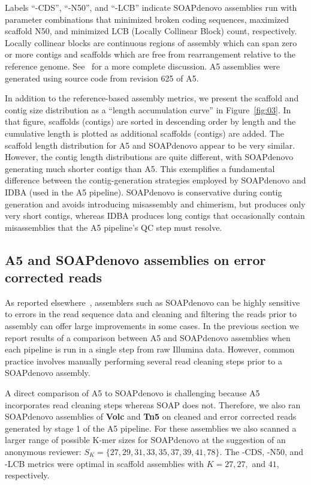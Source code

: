 \documentclass[10pt]{article}
\begin{document}
Labels ``-CDS'', ``-N50'', and ``-LCB'' indicate SOAPdenovo assemblies run with parameter combinations that minimized broken coding 
sequences, maximized scaffold N50, and minimized LCB (Locally Collinear Block) count, respectively. Locally collinear blocks are continuous regions of assembly which can span zero or more contigs and scaffolds which are free from rearrangement relative to the reference genome. See~\cite{mauve,Darling2011} for a more complete discussion.
A5 assemblies were generated using source code from revision 625 of A5.

In addition to the reference-based assembly metrics, we present the scaffold and contig size distribution as a ``length accumulation curve'' in Figure~\ref{fig:03}. 
In that figure, scaffolds (contigs) are sorted in descending order by length and the cumulative length is plotted as additional scaffolds (contigs) are added. 
The scaffold length distribution for A5 and SOAPdenovo appear to be very similar. However, the contig length distributions are quite different, with SOAPdenovo generating much shorter contigs than A5.
This exemplifies a fundamental difference between the contig-generation strategies employed by SOAPdenovo and IDBA (used in the A5 pipeline).
SOAPdenovo is conservative during contig generation and avoids introducing misassembly and chimerism, but produces only very short contigs, whereas IDBA produces long contigs that occasionally contain misassemblies that the A5 pipeline's QC step must resolve.

\subsection*{A5 and SOAPdenovo assemblies on error corrected reads}

As reported elsewhere~\cite{Salzberg2011}, assemblers such as SOAPdenovo can be highly sensitive to errors in the read sequence data and cleaning and filtering the reads prior to assembly can offer large improvements in some cases.
In the previous section we report results of a comparison between A5 and SOAPdenovo assemblies when each pipeline is run in a single step from raw Illumina data.
However, common practice involves manually performing several read cleaning steps prior to a SOAPdenovo assembly.

A direct comparison of A5 to SOAPdenovo is challenging because A5 incorporates read cleaning steps whereas SOAP does not. Therefore, we also ran SOAPdenovo assemblies of \textbf{Volc} and \textbf{Tn5} on cleaned and error corrected reads generated by stage 1 of the A5 pipeline.
For these assemblies we also scanned a larger range of possible K-mer sizes for SOAPdenovo at the suggestion of an anonymous reviewer: $S_K = \{27,29,31,33,35,37,39,41,78\}$. The -CDS, -N50, and -LCB metrics were optimal in scaffold assemblies with $K=27, 27,$ and $41$, respectively.
\end{document}
